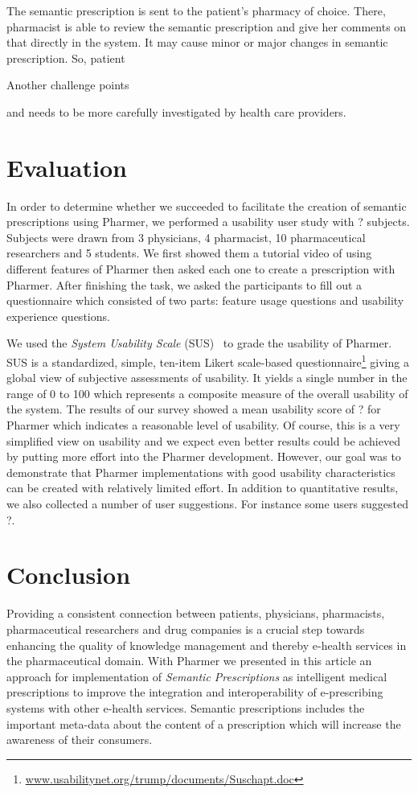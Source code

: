 \documentclass[10pt, conference, compsocconf]{IEEEtran}
\begin{document}
The semantic prescription is sent to the patient's pharmacy of choice. There, pharmacist is able to review the semantic prescription and give her comments on that directly in the system. It may cause minor or major changes in semantic prescription. So, patient





Another challenge points

 and needs to be more carefully investigated by health care providers.




\section{Evaluation}
\label{sec:evaluation}
In order to determine whether we succeeded to facilitate the creation of semantic prescriptions using Pharmer, we performed a usability user study with ? subjects.
Subjects were drawn from 3 physicians, 4 pharmacist, 10 pharmaceutical researchers and 5 students.
We first showed them a tutorial video of using different features of Pharmer then asked each one to create a prescription with Pharmer.
After finishing the task, we asked the participants to fill out a questionnaire which consisted of two parts: feature usage questions and usability experience questions.

We used the \emph{System Usability Scale} (SUS)~\cite{SUS2009} to grade the usability of Pharmer.
SUS is a standardized, simple, ten-item Likert scale-based questionnaire\footnote{\url{www.usabilitynet.org/trump/documents/Suschapt.doc}} giving a global view of subjective assessments of usability.
It yields a single number in the range of 0 to 100 which represents a composite measure of the overall usability of the system.
The results of our survey showed a mean usability score of ? for Pharmer which indicates a reasonable level of usability.
Of course, this is a very simplified view on usability and we expect even better results could be achieved by putting more effort into the Pharmer development.
However, our goal was to demonstrate that Pharmer implementations with good usability characteristics can be created with relatively limited effort.
In addition to quantitative results, we also collected a number of user suggestions.
For instance some users suggested ?.


\section{Conclusion}
\label{sec:conclusion}
Providing a consistent connection between patients, physicians, pharmacists, pharmaceutical researchers and drug companies is a crucial step towards enhancing the quality of knowledge management and thereby e-health services in the pharmaceutical domain.
With Pharmer we presented in this article an approach for implementation of \emph{Semantic Prescriptions} as intelligent medical prescriptions to improve the integration and interoperability of e-prescribing systems with other e-health services.
Semantic prescriptions includes the important meta-data about the content of a prescription which will increase the awareness of their consumers.
\end{document}
